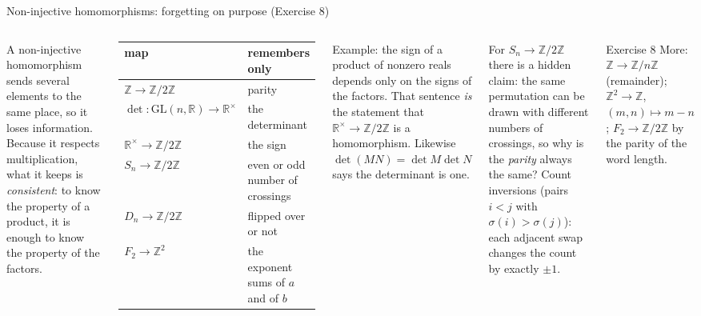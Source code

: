 \documentclass[aspectratio=169,10pt]{beamer}
\newcommand{\Z}{\mathbb{Z}}
\newcommand{\R}{\mathbb{R}}
\newcommand{\GL}{\mathrm{GL}}
\begin{document}
\begin{frame}{Non-injective homomorphisms: forgetting on purpose (Exercise 8)}
\begin{columns}[T]
A non-injective homomorphism sends several elements to the same place, so it loses information. Because it respects multiplication, what it keeps is \emph{consistent}: to know the property of a product, it is enough to know the property of the factors.
\begin{center}\footnotesize
\begin{tabular}{@{}ll@{}}
\toprule
map & remembers only\\
\midrule
$\Z\to\Z/2\Z$ & parity\\
$\det:\GL(n,\R)\to\R^\times$ & the determinant\\
$\R^\times\to\Z/2\Z$ & the sign\\
$S_n\to\Z/2\Z$ & even or odd number of crossings\\
$D_n\to\Z/2\Z$ & flipped over or not\\
$F_2\to\Z^2$ & the exponent sums of $a$ and of $b$\\
\bottomrule
\end{tabular}
\end{center}
\begin{whybox}
Example: the sign of a product of nonzero reals depends only on the signs of the factors. That sentence \emph{is} the statement that $\R^\times\to\Z/2\Z$ is a homomorphism. Likewise $\det(MN)=\det M\det N$ says the determinant is one.
\end{whybox}
\begin{pitbox}
For $S_n\to\Z/2\Z$ there is a hidden claim: the same permutation can be drawn with different numbers of crossings, so why is the \emph{parity} always the same? Count inversions (pairs $i<j$ with $\sigma(i)>\sigma(j)$): each adjacent swap changes the count by exactly $\pm1$.
\end{pitbox}
\begin{exbox}{Exercise 8}
More: $\Z\to\Z/n\Z$ (remainder); $\Z^2\to\Z$, $(m,n)\mapsto m-n$; $F_2\to\Z/2\Z$ by the parity of the word length.
\end{exbox}
\end{columns}
\end{frame}
\end{document}
